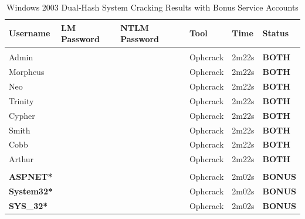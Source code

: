 \begin{table}[H]
\centering
\label{tab:win2003-passwords}
\caption{Windows 2003 Dual-Hash System Cracking Results with Bonus Service Accounts}
\begin{tabularx}{\columnwidth}{@{}L{1.6cm}L{2cm}L{2cm}L{1.8cm}R{1cm}R{1.4cm}@{}}
\toprule
\textbf{Username} & \textbf{LM Password} & \textbf{NTLM Password} & \textbf{Tool} & \textbf{Time} & \textbf{Status} \\
\midrule
{}
 \\
Admin &  &  & Ophcrack & 2m22s & \textbf{BOTH} \\
Morpheus &  &  & Ophcrack & 2m22s & \textbf{BOTH} \\
Neo &  &  & Ophcrack & 2m22s & \textbf{BOTH} \\
Trinity &  &  & Ophcrack & 2m22s & \textbf{BOTH} \\
Cypher &  &  & Ophcrack & 2m22s & \textbf{BOTH} \\
Smith &  &  & Ophcrack & 2m22s & \textbf{BOTH} \\
Cobb &  &  & Ophcrack & 2m22s & \textbf{BOTH} \\
Arthur &  &  & Ophcrack & 2m22s & \textbf{BOTH} \\
\midrule
{}
 \\
\textbf{ASPNET*} &  &  & Ophcrack & 2m02s & \textbf{BONUS} \\
\textbf{System32*} &  &  & Ophcrack & 2m02s & \textbf{BONUS} \\
\textbf{SYS\_32*} &  &  & Ophcrack & 2m02s & \textbf{BONUS} \\
\bottomrule
\end{tabularx}
\end{table}

